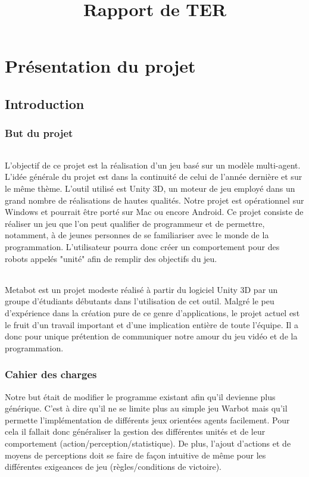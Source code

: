 \documentclass{report}
\title{Rapport de TER}
\begin{document}
\maketitle
\newpage
\tableofcontents
\newpage

\part{Présentation du projet}
\chapter{Introduction}
\section{But du projet}
\paragraph{}
L'objectif de ce projet est la réalisation d'un jeu basé sur un modèle multi-agent. L'idée générale du projet est dans la continuité de celui de l'année dernière et sur le même thème. L'outil utilisé est Unity 3D, un moteur de jeu employé dans un grand nombre de réalisations de hautes qualités. Notre projet est opérationnel sur Windows et pourrait être porté sur Mac ou encore Android.
Ce projet consiste de réaliser un jeu que l'on peut qualifier de programmeur et de permettre, notamment, à de jeunes personnes de se familiariser avec le monde de la programmation. L'utilisateur pourra donc créer un comportement pour des robots appelés "unité" afin de remplir des objectifs du jeu.
\paragraph{}
Metabot est un projet modeste réalisé à partir du logiciel Unity 3D par un groupe d'étudiants débutants dans l'utilisation de cet outil. Malgré le peu d'expérience dans la création pure de ce genre d'applications, le projet actuel est le fruit d'un travail important et d'une implication entière de toute l'équipe.
Il a donc pour unique prétention de communiquer notre amour du jeu vidéo et de la programmation.

\section{Cahier des charges}

Notre but était de modifier le programme existant afin qu'il devienne plus générique. C'est à dire qu'il ne se limite plus au simple jeu Warbot mais qu'il permette l'implémentation de différents jeux orientées agents facilement. 
Pour cela il fallait donc généraliser la gestion des différentes unités et de leur comportement (action/perception/statistique). De plus, l'ajout d'actions et de moyens de perceptions doit se faire de façon intuitive de même pour les différentes exigeances de jeu (règles/conditions de victoire). 
\end{document}
